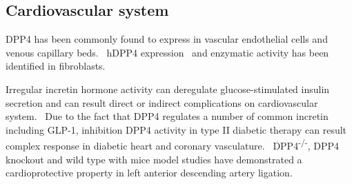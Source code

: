 \subsection{Cardiovascular system}
DPP4 has been commonly found to express in vascular endothelial cells and venous capillary beds.~\cite{Matheeussen2013,Shigeta2012} hDPP4 expression~\cite{Nemoto1999} and enzymatic activity has been identified in fibroblasts.~\cite{Ospelt2010}
\par 
Irregular incretin hormone activity can deregulate glucose-stimulated insulin secretion and can result direct or indirect complications on cardiovascular system.~\cite{Ussher2012} Due to the fact that DPP4 regulates a number of common incretin including GLP-1, inhibition DPP4 activity in type II diabetic therapy can result complex response in diabetic heart and coronary vasculature.~\cite{Ussher2014} DPP4\textsuperscript{-/-}, DPP4 knockout and wild type with mice model studies have demonstrated a cardioprotective property in left anterior descending artery ligation.~\cite{Sauvé2010}  